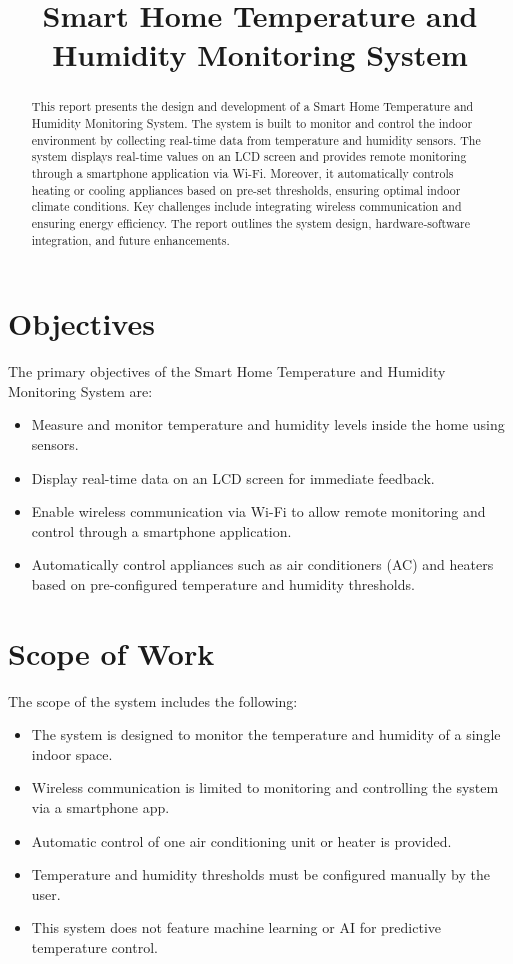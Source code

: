 \documentclass[a4paper,12pt]{article}
\title{Smart Home Temperature and Humidity Monitoring System}
\author{}
\date{}
\begin{document}
\maketitle

\begin{abstract}
This report presents the design and development of a Smart Home Temperature and Humidity Monitoring System. The system is built to monitor and control the indoor environment by collecting real-time data from temperature and humidity sensors. The system displays real-time values on an LCD screen and provides remote monitoring through a smartphone application via Wi-Fi. Moreover, it automatically controls heating or cooling appliances based on pre-set thresholds, ensuring optimal indoor climate conditions. Key challenges include integrating wireless communication and ensuring energy efficiency. The report outlines the system design, hardware-software integration, and future enhancements.
\end{abstract}

\section{Objectives}
The primary objectives of the Smart Home Temperature and Humidity Monitoring System are:
\begin{itemize}
    \item Measure and monitor temperature and humidity levels inside the home using sensors.
    \item Display real-time data on an LCD screen for immediate feedback.
    \item Enable wireless communication via Wi-Fi to allow remote monitoring and control through a smartphone application.
    \item Automatically control appliances such as air conditioners (AC) and heaters based on pre-configured temperature and humidity thresholds.
\end{itemize}

\section{Scope of Work}
The scope of the system includes the following:
\begin{itemize}
    \item The system is designed to monitor the temperature and humidity of a single indoor space.
    \item Wireless communication is limited to monitoring and controlling the system via a smartphone app.
    \item Automatic control of one air conditioning unit or heater is provided.
    \item Temperature and humidity thresholds must be configured manually by the user.
    \item This system does not feature machine learning or AI for predictive temperature control.
\end{itemize}
\end{document}
